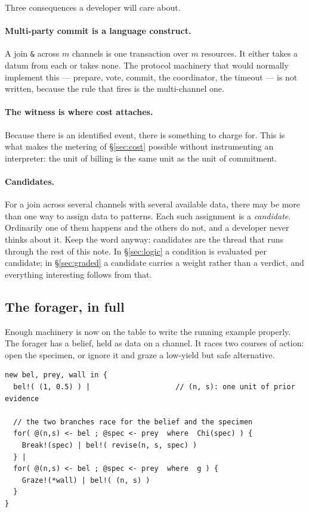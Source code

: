 Three consequences a developer will care about.

\paragraph{Multi-party commit is a language construct.}
A join \texttt{\&} across $m$ channels is one transaction over $m$ resources. It
either takes a datum from each or takes none. The protocol machinery that would
normally implement this --- prepare, vote, commit, the coordinator, the timeout
--- is not written, because the rule that fires is the multi-channel one.

\paragraph{The witness is where cost attaches.}
Because there is an identified event, there is something to charge for. This is
what makes the metering of \S\ref{sec:cost} possible without instrumenting an
interpreter: the unit of billing is the same unit as the unit of commitment.

\paragraph{Candidates.}
For a join across several channels with several available data, there may be
more than one way to assign data to patterns. Each such assignment is a
\emph{candidate}. Ordinarily one of them happens and the others do not, and a
developer never thinks about it. Keep the word anyway: candidates are the thread
that runs through the rest of this note. In \S\ref{sec:logic} a condition is
evaluated per candidate; in \S\ref{sec:graded} a candidate carries a weight
rather than a verdict, and everything interesting follows from that.

\subsection{The forager, in full}

Enough machinery is now on the table to write the running example properly. The
forager has a belief, held as data on a channel. It races two courses of action:
open the specimen, or ignore it and graze a low-yield but safe alternative.

\begin{lstlisting}
new bel, prey, wall in {
  bel!( (1, 0.5) ) |                    // (n, s): one unit of prior evidence

  // the two branches race for the belief and the specimen
  for( @(n,s) <- bel ; @spec <- prey  where  Chi(spec) ) {
    Break!(spec) | bel!( revise(n, s, spec) )
  } |
  for( @(n,s) <- bel ; @spec <- prey  where  g ) {
    Graze!(*wall) | bel!( (n, s) )
  }
}
\end{lstlisting}

